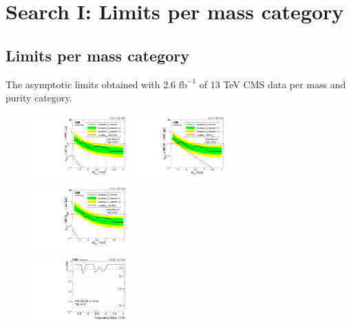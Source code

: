 \chapter{Search I: Limits per mass category}
\vspace*{\fill}\newpage
\section{Limits per mass category}
\label{app:search1}
The asymptotic limits obtained with 2.6 $\textrm{fb}^{-1}$ of 13 TeV CMS data per mass and purity category.
\begin{figure}[h!]
\centering
\includegraphics[width=0.327\textwidth]{figures/analysis/search1/AN-15-211/limits/brazilianFlag_BulkWW_VVHP_new_combined_purity_13TeV_wPDF.pdf}
\includegraphics[width=0.327\textwidth]{figures/analysis/search1/AN-15-211/limits/brazilianFlag_WZ_VVHP_new_combined_purity_13TeV_wPDF.pdf}
\includegraphics[width=0.327\textwidth]{figures/analysis/search1/AN-15-211/limits/brazilianFlag_BulkZZ_VVHP_new_combined_purity_13TeV_wPDF.pdf}\\
\includegraphics[width=0.327\textwidth]{figures/analysis/search1/AN-15-211/pvalues/pvalue_BulkWWinVVnew_high_purity.pdf}

\end{figure}
